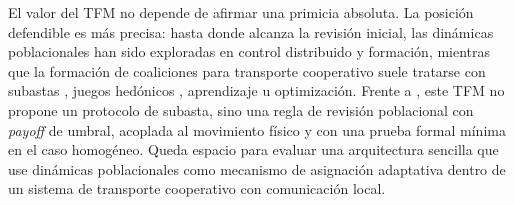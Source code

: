 \documentclass[11pt,a4paper]{article}
\begin{document}
El valor del TFM no depende de afirmar una primicia absoluta. La posición defendible es más precisa: hasta donde alcanza la revisión inicial, las dinámicas poblacionales han sido exploradas en control distribuido y formación, mientras que la formación de coaliciones para transporte cooperativo suele tratarse con subastas \citep{choi2009consensus,shan2024distributed}, juegos hedónicos \citep{dutta2021hedonic}, aprendizaje \citep{shibata2023event,shibata2023learning,paul2023efficient,bezerra2025learning} u optimización. Frente a \citet{shan2024distributed}, este TFM no propone un protocolo de subasta, sino una regla de revisión poblacional con \textit{payoff} de umbral, acoplada al movimiento físico y con una prueba formal mínima en el caso homogéneo. Queda espacio para evaluar una arquitectura sencilla que use dinámicas poblacionales como mecanismo de asignación adaptativa dentro de un sistema de transporte cooperativo con comunicación local.
\end{document}
